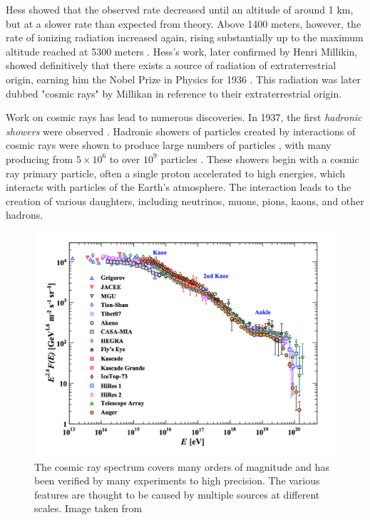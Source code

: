 Hess showed that the observed rate decreased until an altitude of around 1 km, but at a slower rate than expected from theory.
Above 1400 meters, however, the rate of ionizing radiation increased again, rising substantially up to the maximum altitude reached at 5300 meters \cite{Compton-CRAltitude}.
Hess's work, later confirmed by Henri Millikin, showed definitively that there exists a source of radiation of extraterrestrial origin, earning him the Nobel Prize in Physics for 1936 \cite{NobelPrize:1936-Hess}.
This radiation was later dubbed "cosmic rays" by Millikan in reference to their extraterrestrial origin.

Work on cosmic rays has lead to numerous discoveries.
In 1937, the first \emph{hadronic showers} were observed \cite{Blau-HadronicShowers}. 
Hadronic showers of particles created by interactions of cosmic rays were shown to produce large numbers of particles \cite{Kolhoerster-CoincidenceDetectors, Hoerandel-CRHistory}, with many producing from $5\times10^6$ to over $10^9$ particles \cite{CosmicRays-Extent}.
These showers begin with a cosmic ray primary particle, often a single proton accelerated to high energies, which interacts with particles of the Earth's atmosphere.
The interaction leads to the creation of various daughters, including neutrinos, muons, pions, kaons, and other hadrons.

\begin{figure}[!h]
\centering
\includegraphics[width=0.9\linewidth]{CR_Spectrum_PDG15.png}
\caption{The cosmic ray spectrum covers many orders of magnitude and has been verified by many experiments to high precision. The various features are thought to be caused by multiple sources at different scales. Image taken from \cite{PDG-2015}}
\label{fig:CR_spectrum}
\end{figure}


